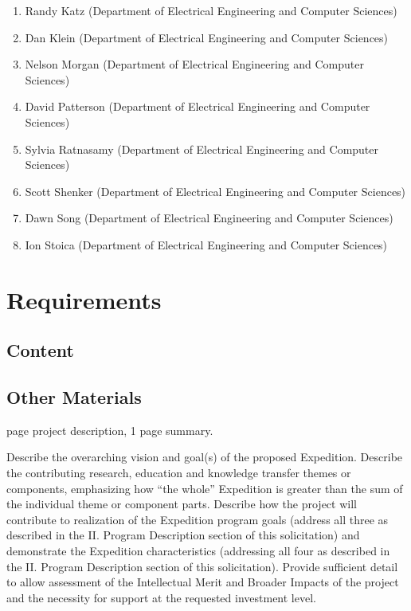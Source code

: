 \documentclass [10pt]{article}
\begin{document}
\begin{outline}
\begin{enumerate}
\item Randy Katz (Department of Electrical Engineering and Computer Sciences)


\item Dan Klein  (Department of Electrical Engineering and Computer Sciences)

\item Nelson Morgan  (Department of Electrical Engineering and Computer Sciences)


\item David Patterson (Department of Electrical Engineering and Computer Sciences)

\item Sylvia Ratnasamy  (Department of Electrical Engineering and Computer Sciences)


\item Scott Shenker (Department of Electrical Engineering and Computer Sciences)

\item Dawn Song (Department of Electrical Engineering and Computer Sciences)


\item Ion Stoica (Department of Electrical Engineering and Computer Sciences)


\end{enumerate}


\newpage

\section*{Requirements}

\subsection*{Content}

\subsection*{Other Materials}

 page project description, 1 page summary.

\1 Describe the overarching vision and goal(s) of the proposed Expedition.  Describe the contributing research, education and knowledge transfer themes or components, emphasizing how “the whole” Expedition is greater than the sum of the individual theme or component parts.  Describe how the project will contribute to realization of the Expedition program goals (address all three as described in the II. Program Description section of this solicitation) and demonstrate the Expedition characteristics (addressing all four as described in the II. Program Description section of this solicitation).  Provide sufficient detail to allow assessment of the Intellectual Merit and Broader Impacts of the project and the necessity for support at the requested investment level.  


\end{outline}
\end{document}
